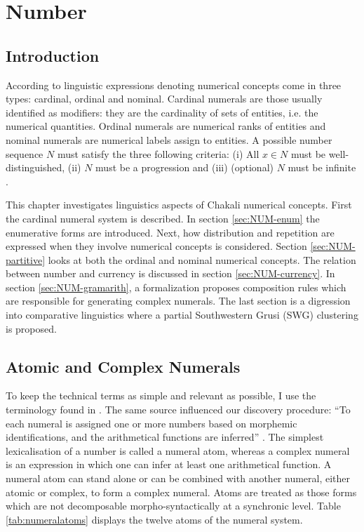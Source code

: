 

\chapter{Number}
\label{sec:NUM}

\section{Introduction}
\label{sec:NUM-intro}

According to \cite{Wies03} linguistic expressions denoting numerical concepts
come in three types: cardinal, ordinal and nominal. Cardinal numerals are those
usually  identified as modifiers: they are the cardinality of  sets of entities,
i.e. the numerical quantities.  Ordinal numerals are numerical ranks of entities
and nominal numerals are  numerical labels assign to entities.  A possible
number sequence
$N$ must satisfy the three following criteria: (i) All $x\in N$ must be
well-distinguished, (ii) $N$ must be a progression and (iii) (optional) $N$ must
be
infinite \citep[304]{Wies03}.  

This chapter investigates  linguistics aspects of Chakali numerical concepts.
First the cardinal numeral system is described. In section
\ref{sec:NUM-enum}  the enumerative forms are introduced. Next,  how
distribution and repetition are expressed when they involve numerical concepts
is considered.
Section
\ref{sec:NUM-partitive} looks at both the ordinal and nominal numerical
concepts.  The relation between number and currency is  discussed in section
\ref{sec:NUM-currency}.  In section \ref{sec:NUM-gramarith}, a 
formalization  proposes composition rules which are responsible for
generating  complex numerals. The last section  is a digression into
comparative  linguistics  where a partial Southwestern Grusi (SWG)
clustering is proposed.



\section{Atomic and Complex Numerals}
\label{sec:NUM-bas-comp}

To keep the technical terms as simple and relevant as possible, I use the
terminology  found in \cite{Gree78b}. The same source influenced our
discovery
procedure: ``To each numeral is assigned one or more numbers based on morphemic
identifications, and the arithmetical functions are inferred''
\cite[263]{Gree78b}. The simplest lexicalisation of a number is called a numeral
atom, whereas a complex numeral is an expression in which  one can infer at
least one arithmetical function.  A numeral atom can stand alone or can
be combined
with another numeral, either atomic or complex, to form a complex numeral. Atoms
are treated as  those forms which are not decomposable morpho-syntactically at a
synchronic level. Table \ref{tab:numeralatoms} displays the twelve
atoms of the numeral system.

